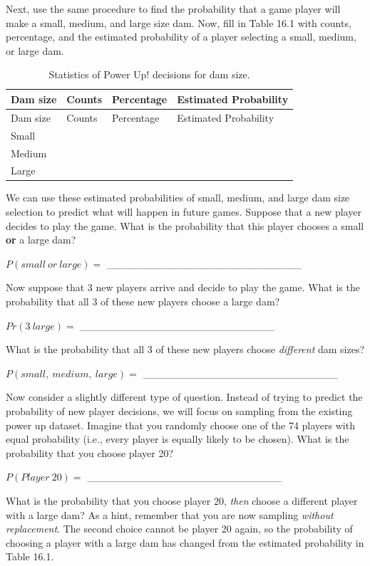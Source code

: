 \documentclass[
]{scrbook}
\begin{document}
Next, use the same procedure to find the probability that a game player will make a small, medium, and large size dam.
Now, fill in Table 16.1 with counts, percentage, and the estimated probability of a player selecting a small, medium, or large dam.

\begin{longtable}[]{@{}llll@{}}
\caption{Statistics of Power Up! decisions for dam size.}\tabularnewline
\toprule
Dam size & Counts & Percentage & Estimated Probability \\
\midrule
\endfirsthead
\toprule
Dam size & Counts & Percentage & Estimated Probability \\
\midrule
\endhead
Small & & & \\
Medium & & & \\
Large & & & \\
\bottomrule
\end{longtable}

We can use these estimated probabilities of small, medium, and large dam size selection to predict what will happen in future games.
Suppose that a new player decides to play the game.
What is the probability that this player chooses a small \textbf{or} a large dam?

\(P(small\:or\:large) =\) \_\_\_\_\_\_\_\_\_\_\_\_\_\_\_\_\_\_\_\_\_\_\_\_\_\_

Now suppose that 3 new players arrive and decide to play the game.
What is the probability that all 3 of these new players choose a large dam?

\(Pr(3\:large) =\) \_\_\_\_\_\_\_\_\_\_\_\_\_\_\_\_\_\_\_\_\_\_\_\_\_\_

What is the probability that all 3 of these new players choose \emph{different} dam sizes?

\(P(small,\:medium,\:large) =\) \_\_\_\_\_\_\_\_\_\_\_\_\_\_\_\_\_\_\_\_\_\_\_\_\_\_

Now consider a slightly different type of question.
Instead of trying to predict the probability of new player decisions, we will focus on sampling from the existing power up dataset.
Imagine that you randomly choose one of the 74 players with equal probability (i.e., every player is equally likely to be chosen).
What is the probability that you choose player 20?

\(P(Player\:20) =\) \_\_\_\_\_\_\_\_\_\_\_\_\_\_\_\_\_\_\_\_\_\_\_\_\_\_

What is the probability that you choose player 20, \emph{then} choose a different player with a large dam?
As a hint, remember that you are now sampling \emph{without replacement}.
The second choice cannot be player 20 again, so the probability of choosing a player with a large dam has changed from the estimated probability in Table 16.1.
\end{document}
